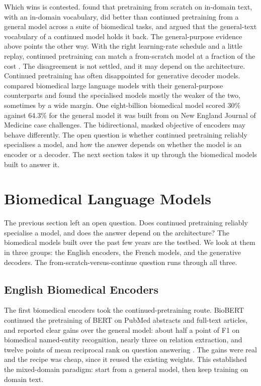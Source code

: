 Which wins is contested. \citet{gu_domain-specific_2022} found that pretraining from
scratch on in-domain text, with an in-domain vocabulary, did better than continued
pretraining from a general model across a suite of biomedical tasks, and argued that
the general-text vocabulary of a continued model holds it back. The general-purpose
evidence above points the other way. With the right learning-rate schedule and a
little replay, continued pretraining can match a from-scratch model at a fraction of
the cost \citep{ibrahim2024simple}. The disagreement is not settled, and it may depend
on the architecture. Continued pretraining has often disappointed for generative
decoder models. \citet{dorfner2024biomedical} compared biomedical large language models
with their general-purpose counterparts and found the specialised models mostly the
weaker of the two, sometimes by a wide margin. One eight-billion biomedical model
scored 30\% against 64.3\% for the general model it was built from on New England
Journal of Medicine case challenges. The bidirectional, masked objective of encoders
may behave differently. The open question is whether continued pretraining reliably
specialises a model, and how the answer depends on whether the model is an encoder or a
decoder. The next section takes it up through the biomedical models built to answer it.
\section{Biomedical Language Models}
\label{sec:lm-biomedical}

The previous section left an open question. Does continued pretraining reliably
specialise a model, and does the answer depend on the architecture? The biomedical
models built over the past few years are the testbed. We look at them in three groups:
the English encoders, the French models, and the generative decoders. The
from-scratch-versus-continue question runs through all three.

\subsection{English Biomedical Encoders}

The first biomedical encoders took the continued-pretraining route. BioBERT continued
the pretraining of BERT on PubMed abstracts and full-text articles, and reported clear
gains over the general model: about half a point of F1 on biomedical named-entity
recognition, nearly three on relation extraction, and twelve points of mean reciprocal
rank on question answering \citep{lee_biobert_2019}. The gains were real and the recipe
was cheap, since it reused the existing weights. This established the
mixed-domain paradigm: start from a general model, then keep training on domain text.

